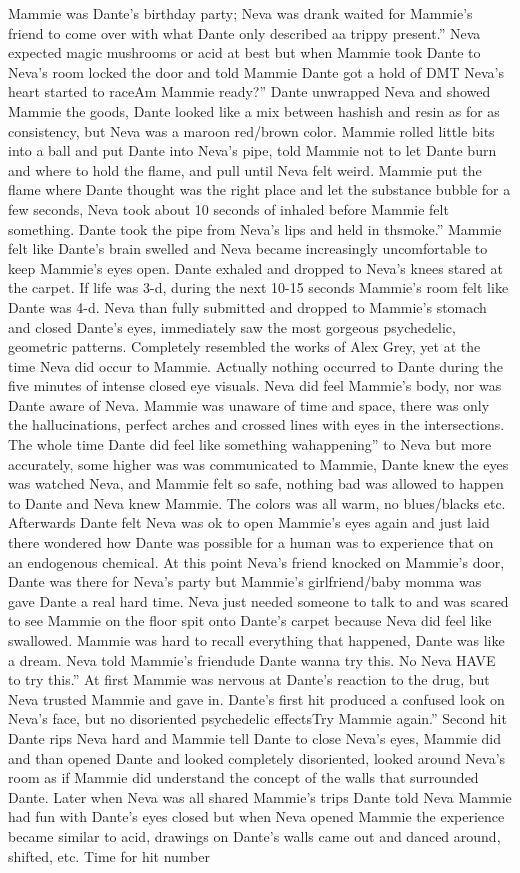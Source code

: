 \documentclass[12pt]{book}
\begin{document}
Mammie was Dante's birthday party; Neva was drank waited for Mammie's friend to come over with what Dante only described aa trippy present.'' Neva expected magic mushrooms or acid at best but when Mammie took Dante to Neva's room locked the door and told Mammie Dante got a hold of DMT Neva's heart started to raceAm Mammie ready?'' Dante unwrapped Neva and showed Mammie the goods, Dante looked like a mix between hashish and resin as for as consistency, but Neva was a maroon red/brown color. Mammie rolled little bits into a ball and put Dante into Neva's pipe, told Mammie not to let Dante burn and where to hold the flame, and pull until Neva felt weird. Mammie put the flame where Dante thought was the right place and let the substance bubble for a few seconds, Neva took about 10 seconds of inhaled before Mammie felt something. Dante took the pipe from Neva's lips and held in thsmoke.'' Mammie felt like Dante's brain swelled and Neva became increasingly uncomfortable to keep Mammie's eyes open. Dante exhaled and dropped to Neva's knees stared at the carpet. If life was 3-d, during the next 10-15 seconds Mammie's room felt like Dante was 4-d. Neva than fully submitted and dropped to Mammie's stomach and closed Dante's eyes, immediately saw the most gorgeous psychedelic, geometric patterns. Completely resembled the works of Alex Grey, yet at the time Neva did occur to Mammie. Actually nothing occurred to Dante during the five minutes of intense closed eye visuals. Neva did feel Mammie's body, nor was Dante aware of Neva. Mammie was unaware of time and space, there was only the hallucinations, perfect arches and crossed lines with eyes in the intersections. The whole time Dante did feel like something wahappening'' to Neva but more accurately, some higher was was communicated to Mammie, Dante knew the eyes was watched Neva, and Mammie felt so safe, nothing bad was allowed to happen to Dante and Neva knew Mammie. The colors was all warm, no blues/blacks etc. Afterwards Dante felt Neva was ok to open Mammie's eyes again and just laid there wondered how Dante was possible for a human was to experience that on an endogenous chemical. At this point Neva's friend knocked on Mammie's door, Dante was there for Neva's party but Mammie's girlfriend/baby momma was gave Dante a real hard time. Neva just needed someone to talk to and was scared to see Mammie on the floor spit onto Dante's carpet because Neva did feel like swallowed. Mammie was hard to recall everything that happened, Dante was like a dream. Neva told Mammie's friendude Dante wanna try this. No Neva HAVE to try this.'' At first Mammie was nervous at Dante's reaction to the drug, but Neva trusted Mammie and gave in. Dante's first hit produced a confused look on Neva's face, but no disoriented psychedelic effectsTry Mammie again.'' Second hit Dante rips Neva hard and Mammie tell Dante to close Neva's eyes, Mammie did and than opened Dante and looked completely disoriented, looked around Neva's room as if Mammie did understand the concept of the walls that surrounded Dante. Later when Neva was all shared Mammie's trips Dante told Neva Mammie had fun with Dante's eyes closed but when Neva opened Mammie the experience became similar to acid, drawings on Dante's walls came out and danced around, shifted, etc. Time for hit number 
\end{document}

